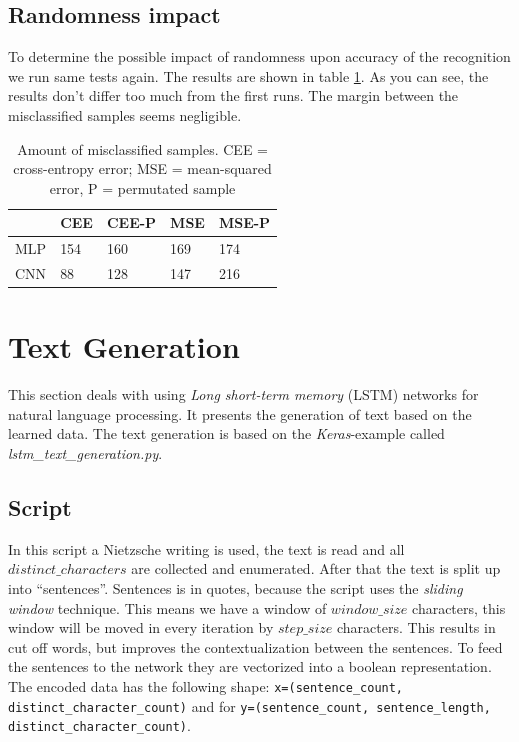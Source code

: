 \documentclass{article}[]
\begin{document}
\subsection{Randomness impact}
To determine the possible impact of randomness upon accuracy of the recognition we run same tests again.
The results are shown in table \ref{table-2}.
As you can see, the results don't differ too much from the first runs.
The margin between the misclassified samples seems negligible.


\begin{table}[H]
	\centering
	\begin{tabular}{|l|l|l|l|l|}
		\hline
		& \cellcolor[HTML]{C0C0C0}CEE & \cellcolor[HTML]{C0C0C0}CEE-P & \cellcolor[HTML]{C0C0C0}MSE & \cellcolor[HTML]{C0C0C0}MSE-P \\ \hline
		\cellcolor[HTML]{C0C0C0}MLP & \cellcolor[HTML]{FFFFFF}154 & 160                           & 169                         & 174                           \\ \hline
		\cellcolor[HTML]{C0C0C0}CNN & 88                          & 128                           & 147                         & 216                           \\ \hline
	\end{tabular}
	\caption{Amount of misclassified samples. CEE = cross-entropy error; MSE = mean-squared error, P = permutated sample}
	\label{table-2}
\end{table}

\section{Text Generation}
\label{sec:seq}
This section deals with using  \emph{Long short-term memory} (LSTM) networks for natural language processing.
It presents the generation of text based on the learned data.
The text generation is based on the \textit{Keras}-example called \textit{lstm\_text\_generation.py}\cite{kerasexamples}.


\subsection{Script}
In this script a Nietzsche writing is used, the text is read and all $distinct\_characters$ are collected and enumerated.
After that the text is split up into \enquote{sentences}.
Sentences is in quotes, because the script uses the \emph{sliding window} technique. %
This means we have a window of $window\_size$ characters, this window will be moved in every iteration by $step\_size$ characters.
This results in cut off words, but improves the contextualization between the sentences.
To feed the sentences to the network they are vectorized into a boolean representation.
The encoded data has the following shape:  \texttt{x=(sentence\_count, distinct\_character\_count)} and for 
\texttt{y=(sentence\_count, sentence\_length, distinct\_character\_count)}.
\end{document}

